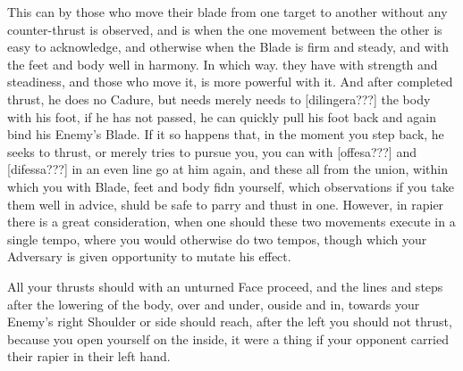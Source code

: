 This can by those who move their blade from one target to another
without any counter-thrust is
observed, and is when the one movement between the other is easy to
acknowledge, and otherwise when the Blade is firm and steady, and with
the feet and body well in harmony. In which way. they have with
strength and steadiness, and those who move it, is more powerful with
it. And after completed thrust, he does no Cadure, but needs merely
needs to [dilingera???] the body with his foot, if he has not passed,
he can quickly pull his foot back and again bind his Enemy's Blade. If
it so happens that, in the moment you step back, he seeks to thrust,
or merely tries to pursue you, you can with [offesa???] and
[difessa???] in an even line go at him again, and these all from the
union, within which you with Blade, feet and body fidn yourself, which
observations if you take them well in advice, shuld be safe to parry
and thust in one. However, in rapier there is a great consideration,
when one should these two movements execute in a single tempo, where
you would otherwise do two tempos, though which your Adversary is
given opportunity to mutate his effect.


All your thrusts should with an unturned Face proceed, and the lines
and steps after the lowering of the body, over and under, ouside and
in, towards your Enemy's right Shoulder or side should reach, after
the left you should not thrust, because you open yourself on the
inside, it were a thing if your opponent carried their rapier in their
left hand.